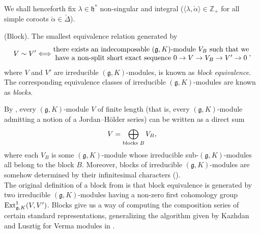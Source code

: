 \noindent We shall henceforth fix $\lambda \in \mathfrak{h}^*$ non-singular and integral ($\langle \lambda, \check{\alpha}\rangle \in \mathbb{Z}_+$ for all simple coroots $\check{\alpha} \in \check{\Delta}$).
\newpage

\noindent\begin{definition}\textup{(Block).} The smallest equivalence relation generated by
\begin{align*}
\begin{split}
V \sim V' \Longleftrightarrow \begin{matrix}\textup{there exists an indecomposable $(\mathfrak{g}, K)$-module $V_B$ such that we}\\\textup{have a non-split short exact sequence $0 \to V \to V_B \to V' \to 0$}\end{matrix},
\end{split}
\end{align*}
where $V$ and $V'$ are irreducible $(\mathfrak{g}, K)$-modules, is known as {\em block equivalence}. The corresponding equivalence classes of irreducible $(\mathfrak{g}, K)$-modules are known as {\em blocks}.\\
\end{definition}

\noindent By \cite[Lemma 9.2.3]{Vog81}, every $(\mathfrak{g}, K)$-module $V$ of finite length (that is, every $(\mathfrak{g}, K)$-module admitting a notion of a Jordan--H\"{o}lder series) can be written as a direct sum
\begin{align*}
\begin{split}
V = \bigoplus_\textup{blocks $B$} V_B,
\end{split}
\end{align*}
\noindent where each $V_B$ is some $(\mathfrak{g}, K)$-module whose irreducible sub-$(\mathfrak{g}, K)$-modules all belong to the block $B$. Moreover, blocks of irreducible $(\mathfrak{g}, K)$-modules are somehow determined by their infinitesimal characters (\cite[Theorem 9.2.11]{Vog81}).\\

\noindent The original definition of a block from \cite[Definition 9.2.1]{Vog81} is that block equivalence is generated by two irreducible $(\mathfrak{g}, K)$-modules having a non-zero first cohomology group $\textup{Ext}_{\mathfrak{g},K}^1(V, V')$. Blocks give us a way of computing the composition series of certain standard representations, generalizing the algorithm given by Kazhdan and Lusztig for Verma modules in \cite{KL79}.\\

